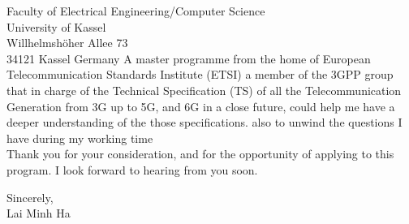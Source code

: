 \documentclass[a4paper,12pt]{letter}
\begin{document}
\begin{letter}{
    Faculty of Electrical Engineering/Computer Science
    \\ University of Kassel
    \\ Willhelmshöher Allee 73
    \\ 34121 Kassel Germany
}
A master programme from the home of European Telecommunication Standards Institute (ETSI) a member of the 3GPP group that in charge of the Technical Specification (TS) of all the Telecommunication Generation from 3G up to 5G, and 6G in a close future, could help me have a deeper understanding of the those specifications.
also to unwind the questions I have during my working time
\\
Thank you for your consideration, and for the opportunity of applying to this program. I look forward to hearing from you soon.


\begin{flushright}
    Sincerely,
    \\ Lai Minh Ha
\end{flushright}

\end{letter}
\end{document}
